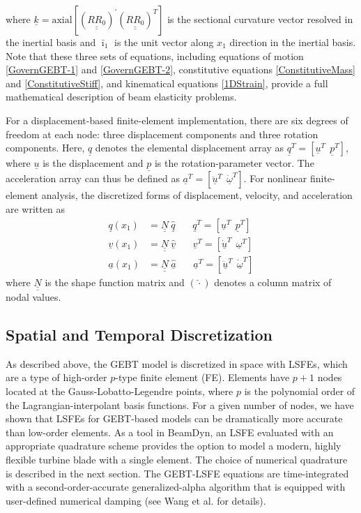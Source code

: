 \documentclass{aiaa-tc}
\newcommand{\tens}[1]{\underline{\underline{#1}}}
\renewcommand{\vec}[1]{\underline{#1}}
\begin{document}
where $\vec{k} = \mathrm{axial}[(\tens{R R_0})^\prime (\tens{R R_0})^T]$ is the sectional
curvature vector resolved in the inertial basis and $\bar{\imath}_1$ is the unit
vector along $x_1$ direction in the inertial basis. Note that these
three sets of equations, including equations of motion
\eqref{GovernGEBT-1} and \eqref{GovernGEBT-2}, constitutive equations
\eqref{ConstitutiveMass} and \eqref{ConstitutiveStiff}, and kinematical
equations \eqref{1DStrain}, provide a full mathematical description of beam elasticity problems. 

For a displacement-based finite-element implementation, there are six
degrees of freedom at each node: three displacement components and three
rotation components. Here, $\vec{q}$ denotes the elemental
displacement array as $\underline{q}^T=\left[
\underline{u}^T~~\underline{p}^T\right]$, where $\vec{u}$ is the
displacement and $\vec{p}$ is the rotation-parameter vector. The
acceleration array can thus be defined as $\underline{a}^T=\left[
\ddot{\underline{u}}^T~~ \dot{\underline{\omega}}^T \right]$. For nonlinear
finite-element analysis, the discretized forms of
displacement, velocity, and acceleration are written as
\begin{align}
	\label{DiscretizedDisp}
	\underline{q} (x_1) &= \underline{\underline{N}} ~\hat{\underline{q}}~~~~~~~~\underline{q}^T = \left[ \underline{u}^T~~\underline{p}^T \right] \\
	\label{DiscretizedVel}
	\underline{v}(x_1) &= \underline{\underline{N}}~\hat{\underline{v}}~~~~~~~~\underline{v}^T = \left[\underline{\dot{u}}^T~~\underline{\omega}^T \right] \\
	\label{DiscretizedAcc}
	\underline{a}(x_1) &= \underline{\underline{N}}~ \hat{\underline{a}}~~~~~~~~\underline{a}^T = \left[ \ddot{\underline{u}}^T~~\dot{\underline{\omega}}^T \right]	
\end{align}
where $\tens{N}$ is the shape function matrix and $(\hat{\cdot})$ denotes a
column matrix of nodal values.

\subsection{Spatial and Temporal Discretization}

As described above, the GEBT model is discretized in space with LSFEs\cite{Ronquist-Patera:1987}, which are a type of high-order $p$-type finite element (FE).   
Elements have $p+1$ nodes located at the Gauss-Lobatto-Legendre points, where $p$ is the polynomial order of the Lagrangian-interpolant basis functions.  
For a given number of nodes, we have shown\cite{Wang:SFE2013,Wang:GEBT2014} that LSFEs for GEBT-based models can be dramatically more accurate than low-order elements.   
As a tool in BeamDyn, an LSFE evaluated with an appropriate quadrature scheme provides the option to model a modern, highly flexible turbine blade with a single element.  
The choice of numerical quadrature is described in the next section.
The GEBT-LSFE equations are time-integrated with a second-order-accurate generalized-alpha algorithm that is equipped with user-defined numerical damping (see Wang et al.\cite{Wang:GEBT2014} for details).  
\end{document}
